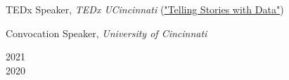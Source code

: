 \vspace{6pt}
\begin{minipage}{.75\linewidth} \begin{flushleft}
    \begin{description}[font=$\bullet$]
    \item{TEDx Speaker, \textit{TEDx UCincinnati} (\href{https://www.ted.com/talks/daniel_posmik_telling_stories_with_data}{"Telling Stories with Data"})}
    \vspace{-6pt}
    \item{Convocation Speaker, \textit{University of Cincinnati}}
    \end{description}
\end{flushleft} \end{minipage}
\hfill 
\begin{minipage}{.20\linewidth}\begin{flushright}
2021 \\
2020
\end{flushright}\end{minipage}
\\
\vspace{7pt}

\vspace{-5pt}
